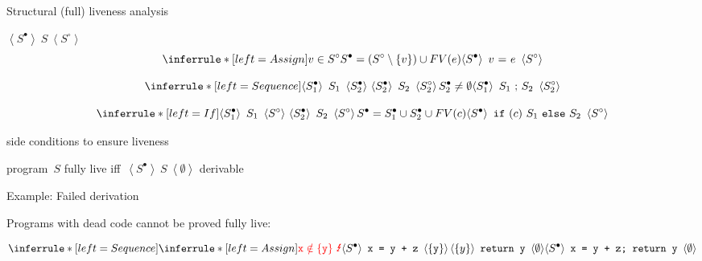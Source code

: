 \documentclass{beamer}
\newcommand{\liveout}[1]{\ensuremath{#1^{\circ}}}
\newcommand{\livein}[1]{\ensuremath{#1^{\bullet}}}
\newcommand{\triple}[3]{\ensuremath{
    \left\langle#1\right\rangle \ #2 \ \left\langle#3\right\rangle
}}
\def\union{\cup}
\begin{document}
\begin{frame}{Structural (full) liveness analysis}

 \(\triple{\livein{S}}{S}{\liveout{S}}\) \\[1em]

\pause
\[
\inferrule*[left=Assign]{
    v \in \liveout{S} \\
    \livein{S} = (\liveout{S} \setminus \{v\}) \union FV(e)
}{
    \triple{\livein{S}}{v\ \mathtt{=}\ e}{\liveout{S}}
}
\]

\pause
\[
\inferrule*[left=Sequence]{
    \triple{\livein{S_1}}{S_1}{\livein{S_2}} \\
    \triple{\livein{S_2}}{S_2}{\liveout{S_2}} \\
    \livein{S_2} \neq \emptyset
}{
    \triple{\livein{S_1}}{S_1\ \mathtt{;}\ S_2}{\liveout{S_2}}
}
\]

\[
\inferrule*[left=If]{
    \triple{\livein{S_1}}{S_1}{\liveout{S}} \\
    \triple{\livein{S_2}}{S_2}{\liveout{S}} \\
    \livein{S} = \livein{S_1} \union \livein{S_2} \union FV(c)
}{
    \triple{\livein{S}}
           {\mathtt{if\ (}c\mathtt{)}\ S_1\ \mathtt{else}\ S_2}
           {\liveout{S}}
}
\]

\pause
side conditions to ensure  liveness

program~\(S\) fully live iff~\triple{\livein{S}}{S}{\emptyset} derivable
\end{frame}


\begin{frame}{Example: Failed derivation}

Programs with dead code cannot be proved fully live:

\[
\inferrule*[left=Sequence]{
    \inferrule*[left=Assign]{
    \textcolor{red}{\mathtt{x} \notin \{\mathtt{y}\}\ \mbox{\Lightning}}
    }{\triple{\livein{S}}{\mbox{\texttt{x = y + z}}}{\{\mathtt{y}\}}}
    \\
    \triple{\{y\}}{\mbox{\texttt{return y}}}{\emptyset} %
}{
\triple{\livein{S}}{\mbox{\texttt{x = y + z; return y}}}{\emptyset}
}
\]

\end{frame}
\end{document}
